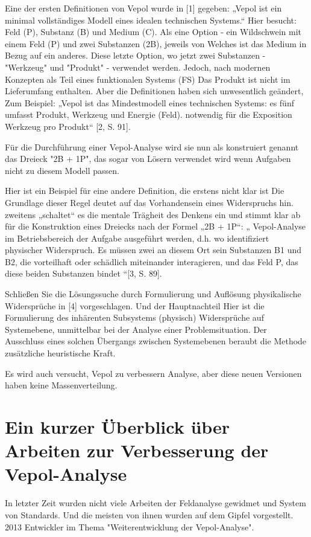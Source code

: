\documentclass[11pt,a4paper]{article}
\begin{document}
Eine der ersten Definitionen von Vepol wurde in [1] gegeben: „Vepol ist ein
minimal vollständiges Modell eines idealen technischen Systems.“ Hier besucht:
Feld (P), Substanz (B) und Medium (C). Als eine Option - ein Wildschwein mit
einem Feld (P) und zwei Substanzen (2B), jeweils von Welches ist das Medium in
Bezug auf ein anderes. Diese letzte Option, wo jetzt zwei Substanzen -
"Werkzeug" und "Produkt" - verwendet werden. Jedoch, nach modernen Konzepten
als Teil eines funktionalen Systems (FS) Das Produkt ist nicht im Lieferumfang
enthalten. Aber die Definitionen haben sich unwesentlich geändert, Zum
Beispiel: „Vepol ist das Mindestmodell eines technischen Systems: es fünf
umfasst Produkt, Werkzeug und Energie (Feld). notwendig für die Exposition
Werkzeug pro Produkt“ [2, S. 91].

Für die Durchführung einer Vepol-Analyse wird sie nun als konstruiert genannt
das Dreieck "2B + 1P", das sogar von Lösern verwendet wird wenn Aufgaben nicht
zu diesem Modell passen.

Hier ist ein Beispiel für eine andere Definition, die erstens nicht klar ist
Die Grundlage dieser Regel deutet auf das Vorhandensein eines Widerspruchs
hin.  zweitens „schaltet“ es die mentale Trägheit des Denkens ein und stimmt
klar ab für die Konstruktion eines Dreiecks nach der Formel „2B + 1P“: „
Vepol-Analyse im Betriebsbereich der Aufgabe ausgeführt werden, d.h. wo
identifiziert physischer Widerspruch. Es müssen zwei an diesem Ort sein
Substanzen B1 und B2, die vorteilhaft oder schädlich miteinander interagieren,
und das Feld P, das diese beiden Substanzen bindet “[3, S. 89].

Schließen Sie die Lösungssuche durch Formulierung und Auflösung physikalische
Widersprüche in [4] vorgeschlagen. Und der Hauptnachteil Hier ist die
Formulierung des inhärenten Subsystems (physisch) Widersprüche auf
Systemebene, unmittelbar bei der Analyse einer Problemsituation.  Der
Ausschluss eines solchen Übergangs zwischen Systemebenen beraubt die Methode
zusätzliche heuristische Kraft.

Es wird auch versucht, Vepol zu verbessern Analyse, aber diese neuen Versionen
haben keine Massenverteilung.

\section*{Ein kurzer Überblick über Arbeiten zur Verbesserung der
  Vepol-Analyse}

In letzter Zeit wurden nicht viele Arbeiten der Feldanalyse gewidmet und
System von Standards. Und die meisten von ihnen wurden auf dem Gipfel
vorgestellt.  2013 Entwickler im Thema "Weiterentwicklung der Vepol-Analyse".
\end{document}
